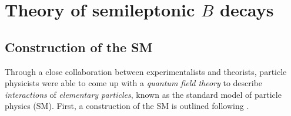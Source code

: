 %
%


\chapter{Theory of semileptonic $B$ decays}
\label{ref:theory}

\section{Construction of the SM}

Through a close collaboration between experimentalists and theorists,
particle physicists were able to come up with a \emph{quantum field theory}
to describe \emph{interactions} of \emph{elementary particles},
known as the standard model of particle physics (SM).
First, a construction of the SM is outlined following
\cite{Robinson_2011,Schwichtenberg_2018}.

